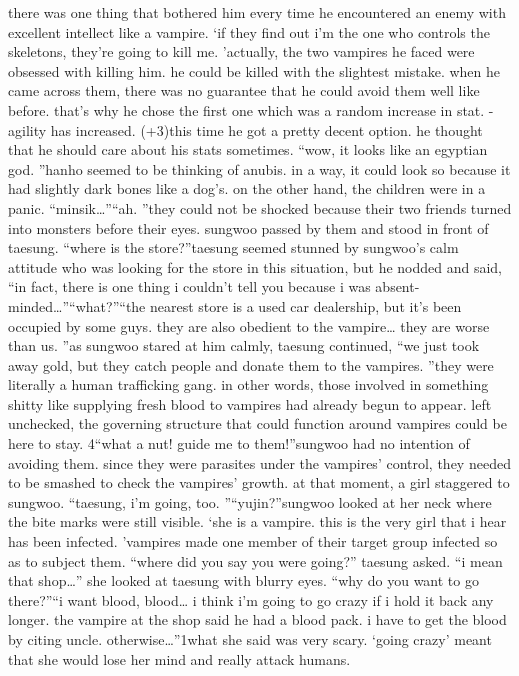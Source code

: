 there was one thing that bothered him every time he encountered an enemy with excellent intellect like a vampire.
‘if they find out i’m the one who controls the skeletons, they’re going to kill me.
’actually, the two vampires he faced were obsessed with killing him.
 he could be killed with the slightest mistake.
 when he came across them, there was no guarantee that he could avoid them well like before.
 that’s why he chose the first one which was a random increase in stat.
-agility has increased.
 (+3)this time he got a pretty decent option.
 he thought that he should care about his stats sometimes.
“wow, it looks like an egyptian god.
”hanho seemed to be thinking of anubis.
 in a way, it could look so because it had slightly dark bones like a dog’s.
on the other hand, the children were in a panic.
“minsik…”“ah.
”they could not be shocked because their two friends turned into monsters before their eyes.
sungwoo passed by them and stood in front of taesung.
“where is the store?”taesung seemed stunned by sungwoo’s calm attitude who was looking for the store in this situation, but he nodded and said, “in fact, there is one thing i couldn’t tell you because i was absent-minded…”“what?”“the nearest store is a used car dealership, but it’s been occupied by some guys.
 they are also obedient to the vampire… they are worse than us.
”as sungwoo stared at him calmly, taesung continued, “we just took away gold, but they catch people and donate them to the vampires.
”they were literally a human trafficking gang.
 in other words, those involved in something shitty like supplying fresh blood to vampires had already begun to appear.
 left unchecked, the governing structure that could function around vampires could be here to stay.
4“what a nut! guide me to them!”sungwoo had no intention of avoiding them.
 since they were parasites under the vampires’ control, they needed to be smashed to check the vampires’ growth.
at that moment, a girl staggered to sungwoo.
“taesung, i’m going, too.
”“yujin?”sungwoo looked at her neck where the bite marks were still visible.
‘she is a vampire.
 this is the very girl that i hear has been infected.
’vampires made one member of their target group infected so as to subject them.
“where did you say you were going?” taesung asked.
“i mean that shop…” she looked at taesung with blurry eyes.
“why do you want to go there?”“i want blood, blood… i think i’m going to go crazy if i hold it back any longer.
 the vampire at the shop said he had a blood pack.
 i have to get the blood by citing uncle.
 otherwise…”1what she said was very scary.
 ‘going crazy’ meant that she would lose her mind and really attack humans.

